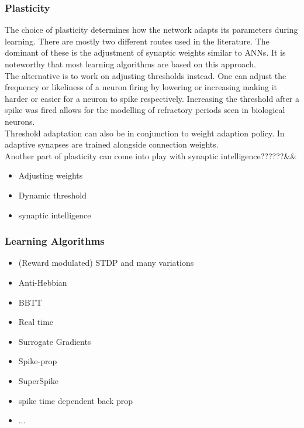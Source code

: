 \subsubsection{Plasticity}
	The choice of plasticity determines how the network adapts its parameters during learning. There are mostly two different routes used in the literature. The dominant of these is the adjustment of synaptic weights similar to \acp{ANN}. It is noteworthy that most learning algorithms are based on this approach.\\
	The alternative is to work on adjusting thresholds instead\cite{chen_adaptive_2022,amin_automated_2021}. One can adjust the frequency or likeliness of a neuron firing by lowering or increasing making it harder or easier for a neuron to spike respectively. Increasing the threshold after a spike was fired allows for the modelling of refractory periods seen in biological neurons.\\
	Threshold adaptation can also be in conjunction to weight adaption policy. In \cite{sun_synapse-threshold_2023} adaptive synapses are trained alongside connection weights.\\
	Another part of plasticity can come into play with synaptic intelligence??????&&

\begin{itemize}
	\item Adjusting weights
	\item Dynamic threshold
	\item synaptic intelligence
\end{itemize}



\subsubsection{Learning Algorithms}

	\begin{itemize}
	\item (Reward modulated) STDP and many variations
	\item Anti-Hebbian
	\item BBTT
	\item Real time
	\item Surrogate Gradients
	\item Spike-prop
	\item SuperSpike
	\item spike time dependent back prop
	\item $\dots$
	\end{itemize}


